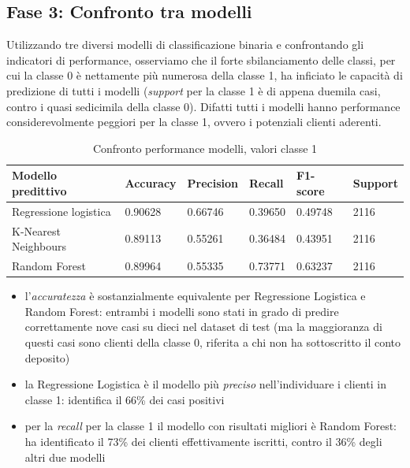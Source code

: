 \documentclass[11,5pt, a4paper]{article}
\begin{document}
\subsection{Fase 3: Confronto tra modelli}
Utilizzando tre diversi modelli di classificazione binaria e confrontando gli indicatori di performance, osserviamo che il forte sbilanciamento delle classi, per cui la classe 0 è nettamente più numerosa della classe 1, ha inficiato le capacità di predizione di tutti i modelli (\textit{support} per la classe 1 è di appena duemila casi, contro i quasi sedicimila della classe 0). Difatti tutti i modelli hanno performance considerevolmente peggiori per la classe 1, ovvero i potenziali clienti aderenti.


\begin{table}[H] 
    \centering
    \begin{tabular}{|l|l|l|l|l|l|}
    \hline
    Modello predittivo     & Accuracy & Precision & Recall & F1-score & Support\\
    \hline
    Regressione logistica     & 0.90628 & 0.66746 & 0.39650 & 0.49748 & 2116\\
    \hline
    K-Nearest Neighbours    & 0.89113 & 0.55261 & 0.36484 & 0.43951 & 2116\\
    \hline
    Random Forest     & 0.89964 & 0.55335 & 0.73771 & 0.63237 & 2116\\
    \hline
    \end{tabular}
    \caption{Confronto performance modelli, valori classe 1}
    \label{tab:models}
\end{table}

\begin{itemize}
    \item l’\textit{accuratezza} è sostanzialmente equivalente per Regressione Logistica e Random Forest: entrambi i modelli sono stati in grado di predire correttamente nove casi su dieci nel dataset di test (ma la maggioranza di questi casi sono clienti della classe 0, riferita a chi non ha sottoscritto il conto deposito)
\end{itemize}

\begin{itemize}
    \item la Regressione Logistica è il modello più \textit{preciso} nell’individuare i clienti in classe 1: identifica il 66\% dei casi positivi
\end{itemize}

\begin{itemize}
    \item per la \textit{recall} per la classe 1 il modello con risultati migliori è Random Forest: ha identificato il 73\% dei clienti effettivamente iscritti, contro il 36\% degli altri due modelli
\end{itemize}
\end{document}
